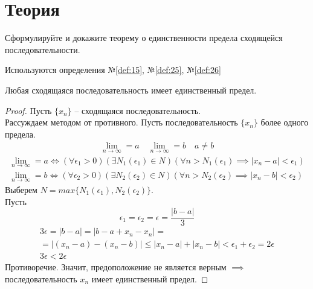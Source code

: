 \section{Теория}



\begin{question}
    Сформулируйте и докажите теорему о единственности предела сходящейся последовательности.
\end{question}
\begin{used}
    Используются определения №\ref{def:15}, №\ref{def:25}, №\ref{def:26}
\end{used}
\begin{theorem}
    Любая сходящаяся последовательность имеет единственный предел.
\end{theorem}
\begin{proof}
    Пусть $\{x_{n}\} $ -- сходящаяся последовательность. \\
    Рассуждаем методом от противного. Пусть последовательность $\{x_{n}\} $ более одного предела.
    \begin{gather*}
        \lim_{n \to \infty} = a \quad
        \lim_{n \to \infty} = b \quad 
        a \neq b
    \end{gather*}
    \begin{gather}
        \lim_{n \to \infty} = a \iff (\forall \epsilon_1 > 0)(\exists N_1(\epsilon_1) \in N)(\forall n > N_1(\epsilon_1) \implies |x_{n} - a| < \epsilon_1) \\
        \lim_{n \to \infty} = b \iff (\forall \epsilon_2 > 0)(\exists N_2(\epsilon_2) \in N)(\forall n > N_2(\epsilon_2) \implies |x_{n} - b| < \epsilon_2)  
    \end{gather} 
    Выберем $N=max \{N_1\left( \epsilon_1 \right) , N_2\left( \epsilon_2 \right) \}$. \\
    Пусть \[
        \epsilon_1 = \epsilon_2 = \epsilon = \frac{|b - a|}{3}
    \]
    \begin{gather*}
        3 \epsilon = |b - a| = |b - a + x_{n} - x_{n}| = \\
        = |(x_{n} - a) - (x_{n} - b)| \le |x_{n} - a| + |x_{n} - b| < \epsilon_1 + \epsilon_2 = 2 \epsilon \\
        3 \epsilon < 2 \epsilon
    \end{gather*}
    Противоречие. Значит, предоположение не является верным $\implies$ последовательность $x_{n}$ имеет единственный предел.
\end{proof}

